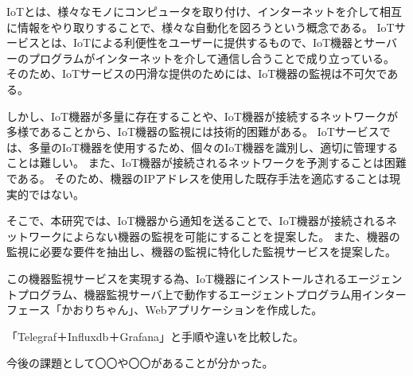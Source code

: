 IoTとは、様々なモノにコンピュータを取り付け、インターネットを介して相互に情報をやり取りすることで、様々な自動化を図ろうという概念である。
IoTサービスとは、IoTによる利便性をユーザーに提供するもので、IoT機器とサーバーのプログラムがインターネットを介して通信し合うことで成り立っている。
そのため、IoTサービスの円滑な提供のためには、IoT機器の監視は不可欠である。
\medskip

しかし、IoT機器が多量に存在することや、IoT機器が接続するネットワークが多様であることから、IoT機器の監視には技術的困難がある。
IoTサービスでは、多量のIoT機器を使用するため、個々のIoT機器を識別し、適切に管理することは難しい。
また、IoT機器が接続されるネットワークを予測することは困難である。
そのため、機器のIPアドレスを使用した既存手法を適応することは現実的ではない。
\medskip

そこで、本研究では、IoT機器から通知を送ることで、IoT機器が接続されるネットワークによらない機器の監視を可能にすることを提案した。
また、機器の監視に必要な要件を抽出し、機器の監視に特化した監視サービスを提案した。
\medskip

この機器監視サービスを実現する為、IoT機器にインストールされるエージェントプログラム、機器監視サーバ上で動作するエージェントプログラム用インターフェース「かおりちゃん」、Webアプリケーションを作成した。
\medskip

「Telegraf＋Influxdb＋Grafana」と手順や違いを比較した。


今後の課題として〇〇や〇〇があることが分かった。




